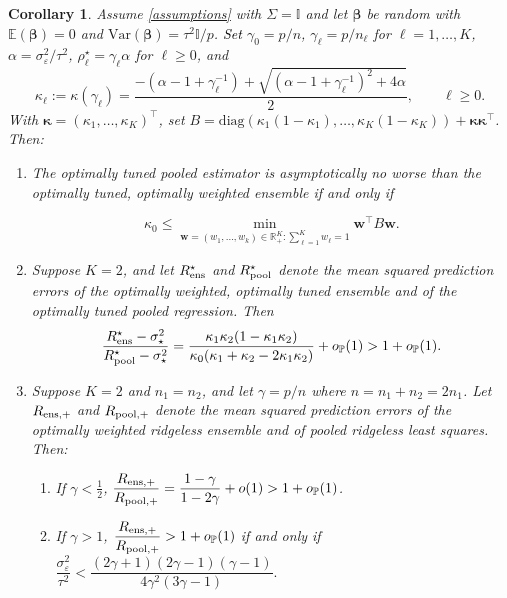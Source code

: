 \documentclass{article}
\theoremstyle{plain}
\newtheorem{corollary}[theorem]{Corollary}
\theoremstyle{remark}
\def \bbeta{\boldsymbol{\beta}}
\def \bbeta{\boldsymbol{\beta}}
\def \I{\mathcal{I}}
\def \E{\mathbb{E}}
\def \P{\mathbb{P}}
\def \I {\mathbb{I}}
\begin{document}
\begin{corollary}\label{cor:comp_k2_iso_re}
Assume \ref{assumptions} with $\Sigma=\I$ and let $\bbeta$ be random with $\E(\bbeta)=0$ and $\mathrm{Var}(\bbeta)=\tau^2\I/p$. \textcolor{black}{Set} $\gamma_0=p/n$, $\gamma_\ell=p/n_\ell$ for $\ell=1,\ldots,K$, $\alpha=\sigma_\varepsilon^2/\tau^2$, $\rho_\ell^\star=\gamma_\ell\alpha$ for $\ell\ge 0$, and
\[
\kappa_\ell:=\kappa(\gamma_\ell)
=\frac{-(\alpha-1+\gamma_\ell^{-1})+\sqrt{(\alpha-1+\gamma_\ell^{-1})^2+4\alpha}}{2},
\qquad \ell\ge 0.
\]
With $\boldsymbol{\kappa}=(\kappa_1,\ldots,\kappa_K)^\top$, set $B=\mathrm{diag}(\kappa_1(1-\kappa_1),\ldots,\kappa_K(1-\kappa_K))+\boldsymbol{\kappa}\boldsymbol{\kappa}^\top$. Then:
\begin{enumerate}
\item The optimally tuned pooled estimator is asymptotically no worse than the optimally tuned, optimally weighted ensemble if and only if

\[
    \kappa_0
    \le
    \min_{\mathbf{w}=(w_1,\ldots,w_k)\in\mathbb{R}_+^K:\sum\limits_{\ell=1}^Kw_{\ell}=1} \mathbf{w}^\top B\mathbf{w}.
\]

\item Suppose $K=2$, and let $R_{\rm ens}^\star$ and $R_{\rm pool}^\star$ denote the mean squared prediction errors of the optimally weighted, optimally tuned ensemble and of the optimally tuned pooled regression. Then
\[
\frac{R_{\rm ens}^\star-\sigma_\star^2}
     {R_{\rm pool}^\star-\sigma_\star^2}
=\frac{\kappa_1\kappa_2(1-\kappa_1\kappa_2)}
      {\kappa_0(\kappa_1+\kappa_2-2\kappa_1\kappa_2)}+o_\P(1)>1+o_{\P}(1).
\]

\item Suppose $K=2$ and $n_1=n_2$, and let $\gamma=p/n$ where $n=n_1+n_2=2n_1$. Let $R_{\rm ens,+}$ and $R_{\rm pool,+}$ denote the mean squared prediction errors of the optimally weighted ridgeless ensemble and of pooled ridgeless least squares. Then:
\begin{enumerate}
\item If $\gamma<\tfrac{1}{2}$, $\dfrac{R_{\rm ens,+}}{R_{\rm pool,+}}=\dfrac{1-\gamma}{1-2\gamma}+o(1)>1+o_\P(1)$.

\item If $\gamma>1$, $\dfrac{R_{\rm ens,+}}{R_{\rm pool,+}}>1+o_\P(1)$ if and only if
$\dfrac{\sigma_\varepsilon^2}{\tau^2}<\dfrac{(2\gamma+1)(2\gamma-1)(\gamma-1)}{4\gamma^2(3\gamma-1)}.$
\end{enumerate}
\end{enumerate}
\end{corollary}
\end{document}
